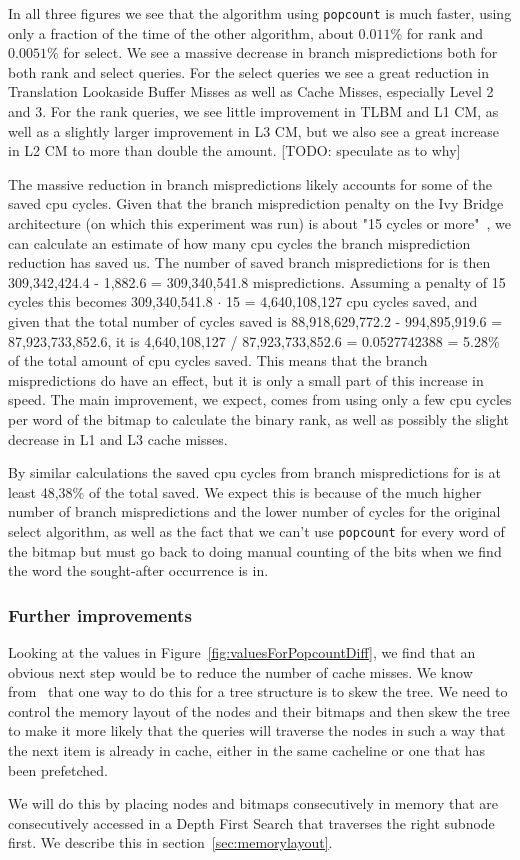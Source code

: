 In all three figures we see that the algorithm using \texttt{popcount} is much faster, using only a fraction of the time of the other algorithm, about $0.011\%$ for rank and $0.0051\%$ for select.
We see a massive decrease in branch mispredictions both for both rank and select queries. For the select queries we see a great reduction in Translation Lookaside Buffer Misses as well as Cache Misses, especially Level 2 and 3.
For the rank queries, we see little improvement in TLBM and L1 CM, as well as a slightly larger improvement in L3 CM, but we also see a great increase in L2 CM to more than double the amount.
[TODO: speculate as to why]


The massive reduction in branch mispredictions likely accounts for some of the saved cpu cycles.
Given that the branch misprediction penalty on the Ivy Bridge architecture (on which this experiment was run) is about "15 cycles or more"~\cite{agner}, we can calculate an estimate of how many cpu cycles the branch misprediction reduction has saved us.
The number of saved branch mispredictions for  is then 309,342,424.4 - 1,882.6 = 309,340,541.8 mispredictions. Assuming a penalty of 15 cycles this becomes 309,340,541.8 $\cdot$ 15 = 4,640,108,127 cpu cycles saved, and given that the total number of cycles saved is 88,918,629,772.2 - 994,895,919.6 = 87,923,733,852.6, it is 4,640,108,127 / 87,923,733,852.6 = 0.0527742388 = 5.28\% of the total amount of cpu cycles saved.
This means that the branch mispredictions do have an effect, but it is only a small part of this increase in speed. The main improvement, we expect, comes from using only a few cpu cycles per word of the bitmap to calculate the binary rank, as well as possibly the slight decrease in L1 and L3 cache misses.


By similar calculations the saved cpu cycles from branch mispredictions for  is at least 48,38\% of the total saved. We expect this is because of the much higher number of branch mispredictions and the lower number of cycles for the original select algorithm, as well as the fact that we can't use \texttt{popcount} for every word of the bitmap but must go back to doing manual counting of the bits when we find the word the sought-after occurrence is in.


\subsubsection{Further improvements}
Looking at the values in Figure~\ref{fig:valuesForPopcountDiff}, we find that an obvious next step would be to reduce the number of cache misses. We know from~\cite{gerthSkewedBinarySearchTrees} that one way to do this for a tree structure is to skew the tree. We need to control the memory layout of the nodes and their bitmaps and then skew the tree to make it more likely that the queries will traverse the nodes in such a way that the next item is already in cache, either in the same cacheline or one that has been prefetched.

We will do this by placing nodes and bitmaps consecutively in memory that are consecutively accessed in a Depth First Search that traverses the right subnode first.
We describe this in section~\ref{sec:memorylayout}.

